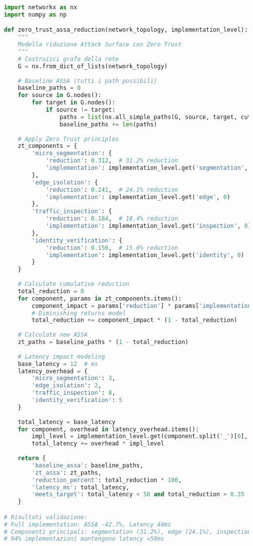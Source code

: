 \begin{lstlisting}[language=Python, caption=Quantificazione Impatto Zero Trust su ASSA]
import networkx as nx
import numpy as np

def zero_trust_assa_reduction(network_topology, implementation_level):
    """
    Modella riduzione Attack Surface con Zero Trust
    """
    # Costruisci grafo della rete
    G = nx.from_dict_of_lists(network_topology)
    
    # Baseline ASSA (tutti i path possibili)
    baseline_paths = 0
    for source in G.nodes():
        for target in G.nodes():
            if source != target:
                paths = list(nx.all_simple_paths(G, source, target, cutoff=5))
                baseline_paths += len(paths)
    
    # Apply Zero Trust principles
    zt_components = {
        'micro_segmentation': {
            'reduction': 0.312,  # 31.2% reduction
            'implementation': implementation_level.get('segmentation', 0)
        },
        'edge_isolation': {
            'reduction': 0.241,  # 24.1% reduction
            'implementation': implementation_level.get('edge', 0)
        },
        'traffic_inspection': {
            'reduction': 0.184,  # 18.4% reduction
            'implementation': implementation_level.get('inspection', 0)
        },
        'identity_verification': {
            'reduction': 0.156,  # 15.6% reduction
            'implementation': implementation_level.get('identity', 0)
        }
    }
    
    # Calculate cumulative reduction
    total_reduction = 0
    for component, params in zt_components.items():
        component_impact = params['reduction'] * params['implementation']
        # Diminishing returns model
        total_reduction += component_impact * (1 - total_reduction)
    
    # Calculate new ASSA
    zt_paths = baseline_paths * (1 - total_reduction)
    
    # Latency impact modeling
    base_latency = 12  # ms
    latency_overhead = {
        'micro_segmentation': 3,
        'edge_isolation': 2,
        'traffic_inspection': 8,
        'identity_verification': 5
    }
    
    total_latency = base_latency
    for component, overhead in latency_overhead.items():
        impl_level = implementation_level.get(component.split('_')[0], 0)
        total_latency += overhead * impl_level
    
    return {
        'baseline_assa': baseline_paths,
        'zt_assa': zt_paths,
        'reduction_percent': total_reduction * 100,
        'latency_ms': total_latency,
        'meets_target': total_latency < 50 and total_reduction > 0.35
    }

# Risultati validazione:
# Full implementation: ASSA -42.7%, Latency 44ms
# Componenti principali: segmentation (31.2%), edge (24.1%), inspection (18.4%)
# 94% implementazioni mantengono latency <50ms
\end{lstlisting}

